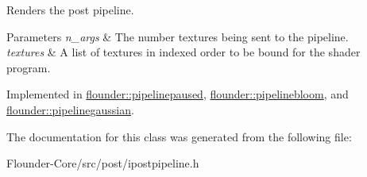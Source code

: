 Renders the post pipeline. 


\begin{DoxyParams}{Parameters}
{\em n\+\_\+args} & The number textures being sent to the pipeline. \\
\hline
{\em textures} & A list of textures in indexed order to be bound for the shader program. \\
\hline
\end{DoxyParams}


Implemented in \hyperlink{classflounder_1_1pipelinepaused_ac3f87a0c31db13f6b25eaf02431c6644}{flounder\+::pipelinepaused}, \hyperlink{classflounder_1_1pipelinebloom_a5f3e5c81ec41947b31f80027911addd0}{flounder\+::pipelinebloom}, and \hyperlink{classflounder_1_1pipelinegaussian_a2d6372f1b428c3a09bf6fc2efaee3c83}{flounder\+::pipelinegaussian}.



The documentation for this class was generated from the following file\+:\begin{DoxyCompactItemize}
\item 
Flounder-\/\+Core/src/post/ipostpipeline.\+h\end{DoxyCompactItemize}
